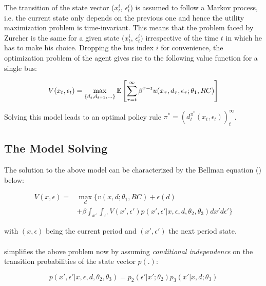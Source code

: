 The transition of the state vector ($x^i_t$, $\epsilon^i_t$) is assumed to follow a Markov process, i.e. the current state only depends on the previous one and hence the utility maximization problem is time-invariant. This means that the problem faced by Zurcher is the same for a given state $(x^i_t$, $\epsilon^i_t)$ irrespective of the time $t$ in which he has to make his choice. Dropping the bus index $i$ for convenience, the optimization problem of the agent gives rise to the following value function for a single bus: 

\begin{equation}
V(x_t, \epsilon_t) = \max_{\{d_t, d_{t+1}, ... \}} \operatorname*{\mathbb{E}} \left[\sum_{\tau=t}^{\infty} \beta^{\tau - t} u(x_\tau, d_\tau, \epsilon_\tau; \theta_1, RC)\right]
\end{equation}

Solving this model leads to an optimal policy rule $\pi^* = (d^{\pi^*}_t(x_t, \epsilon_t))^\infty_t$.

\subsection{The Model Solving}

The solution to the above model can be characterized by the Bellman equation (\cite{Bellman.1954}) below:

\begin{equation}
	\begin{split}
		V(x, \epsilon) = &\max_{d} \{v(x, d; \theta_1, RC) + \epsilon(d) \\[+3mm]
		&+ \beta \int_{x'} \int_{\epsilon'} V(x', \epsilon') p(x', \epsilon'| x, \epsilon, d, \theta_2, \theta_3) dx' d\epsilon'\}
	\end{split}
\end{equation}

with $(x, \epsilon)$ being the current period and $(x', \epsilon')$ the next period state. \paragraph{}

\cite{Rust.1987} simplifies the above problem now by assuming \textit{conditional independence} on the transition probabilities of the state vector $p(.)$: 

\begin{equation}
	p(x', \epsilon'| x, \epsilon, d, \theta_2, \theta_3) = p_2(\epsilon'|x';\theta_2)p_3(x'|x, d; \theta_3) 
\end{equation}

